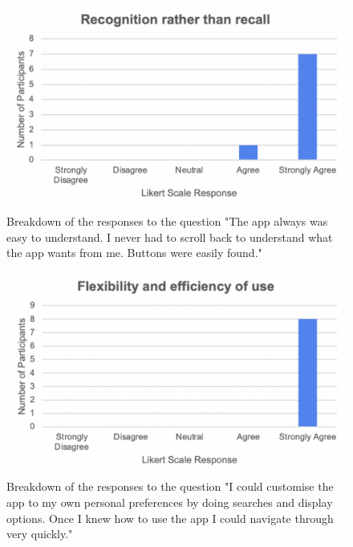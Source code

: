 \documentclass{l4proj}
\begin{document}
\begin{appendices}
\begin{figure}[H]
    \begin{centering}
    \includegraphics[scale=0.5]{images/heuristic6.pdf}
    \caption{Breakdown of the responses to the question "The app always was easy to understand. I never had to scroll back to understand what the app wants from me. Buttons were easily found."}
    \label{fig: heuristic6}
    \end{centering}
\end{figure}

\begin{figure}[H]
    \begin{centering}
    \includegraphics[scale=0.5]{images/heuristic7.pdf}
    \caption{Breakdown of the responses to the question "I could customise the app to my own personal preferences by doing searches and display options. Once I knew how to use the app I could navigate through very quickly."}
    \label{fig: heuristic7}
    \end{centering}
\end{figure}


\end{appendices}
\end{document}
